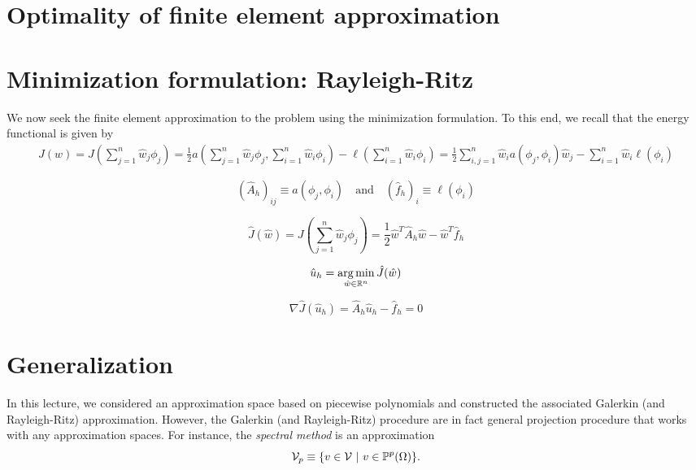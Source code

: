 \section{Optimality of finite element approximation}


\section{Minimization formulation: Rayleigh-Ritz}
We now seek the finite element approximation to the problem using the minimization formulation. To this end, we recall that the energy functional is given by 
\begin{align*}
  J(w) =  J(\sum_{j=1}^n \hat w_j \phi_j)
  = \frac{1}{2} a (\sum_{j=1}^n \hat w_j \phi_j, \sum_{i=1}^n \hat w_i \phi_i) - \ell(\sum_{i=1}^n \hat w_i \phi_i)
  = \frac{1}{2} \sum_{i,j=1}^n \hat w_i a(\phi_j,\phi_i) \hat w_j - \sum_{i=1}^n \hat w_i \ell(\phi_i)
\end{align*}

\begin{equation*}
  (\hat A_h)_{ij} \equiv a(\phi_j,\phi_i)
  \quad \text{and} \quad
  (\hat f_h)_i \equiv \ell(\phi_i)
\end{equation*}

\begin{equation*}
  \hat J(\hat w) = J(\sum_{j=1}^n \hat w_j \phi_j)
  = \frac{1}{2} \hat w^T \hat A_h \hat w - \hat w^T \hat f_h
\end{equation*}

\begin{equation*}
  \hat u_h = \operatorname*{arg\,min}_{\hat w \in \mathbb{R}^n} \hat J(\hat w)
\end{equation*}

\begin{equation*}
  \nabla \hat J(\hat u_h) = \hat A_h \hat u_h - \hat f_h = 0
\end{equation*}

\section{Generalization}
In this lecture, we considered an approximation space based on piecewise polynomials and constructed the associated Galerkin (and Rayleigh-Ritz) approximation. However, the Galerkin (and Rayleigh-Ritz) procedure are in fact general projection procedure that works with any approximation spaces. For instance, the \emph{spectral method} is an approximation 
\begin{equation*}
  \mathcal{V}_p \equiv \{ v \in \mathcal{V} \ | \ v \in \mathbb{P}^p(\Omega) \}.
\end{equation*}
